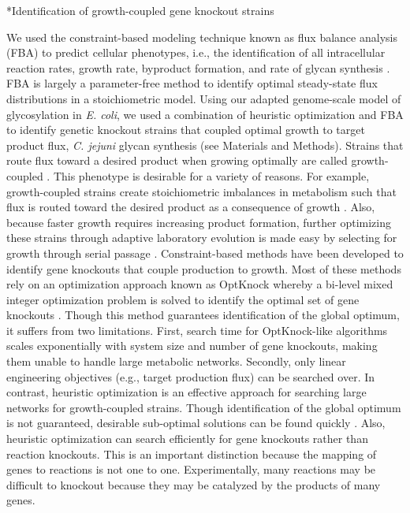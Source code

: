 \documentclass[12pt]{article}
\makeatletter
\renewcommand\subsection{\@startsection
	{subsection}{2}{0mm}
	{-0.05in}
	{-0.5\baselineskip}
	{\normalfont\normalsize\bfseries}}
\makeatother
\begin{document}
\subsection*{Identification of growth-coupled gene knockout strains}

We used the constraint-based modeling technique known as flux balance analysis (FBA) to predict cellular phenotypes, i.e., the identification of all intracellular reaction rates, growth rate, byproduct formation, and rate of glycan synthesis \cite{1994-varma-palsson-NatBiotech}. 
FBA is largely a parameter-free method to identify optimal steady-state flux distributions in a stoichiometric model. 
Using our adapted genome-scale model of glycosylation in \textit{E. coli}, we used a combination of heuristic optimization and FBA to identify genetic knockout strains that coupled optimal growth to target product flux, \textit{C. jejuni} glycan synthesis (see Materials and Methods). 
Strains that route flux toward a desired product when growing optimally are called growth-coupled \cite{2010-feist-orth-palsson-MetabEng}. 
This phenotype is desirable for a variety of reasons. 
For example, growth-coupled strains create stoichiometric imbalances in metabolism such that flux is routed toward the desired product as a consequence of growth \cite{2003-burgard-maranas-BiotechBioeng-02}. 
Also, because faster growth requires increasing product formation, further optimizing these strains through adaptive laboratory evolution is made easy by selecting for growth through serial passage \cite{2010-feist-orth-palsson-MetabEng,2002-ibarra-edwards-palsson-Nat}. 
Constraint-based methods have been developed to identify gene knockouts that couple production to growth. 
Most of these methods rely on an optimization approach known as OptKnock whereby a bi-level mixed integer optimization problem is solved to identify the optimal set of gene knockouts \cite{2003-burgard-maranas-BiotechBioeng-02}. 
Though this method guarantees identification of the global optimum, it suffers from two limitations. 
First, search time for OptKnock-like algorithms scales exponentially with system size and number of gene knockouts, making them unable to handle large metabolic networks. 
Secondly, only linear engineering objectives (e.g., target production flux) can be searched over. 
In contrast, heuristic optimization is an effective approach for searching large networks for growth-coupled strains. 
Though identification of the global optimum is not guaranteed, desirable sub-optimal solutions can be found quickly \cite{2005-patil-nielsen-BMCBioinfo,2008-rocha-nielsen-patil-BMCBioinfo}. 
Also, heuristic optimization can search efficiently for gene knockouts rather than reaction knockouts. 
This is an important distinction because the mapping of genes to reactions is not one to one. 
Experimentally, many reactions may be difficult to knockout because they may be catalyzed by the products of many genes. 
\end{document}
